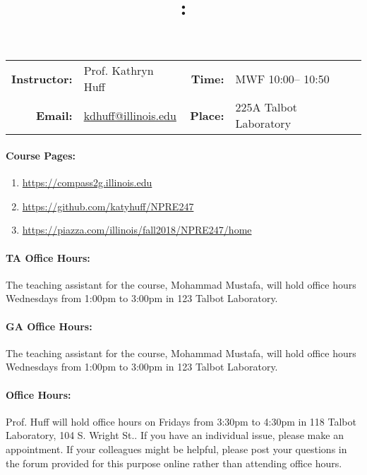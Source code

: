 \documentclass[11pt, a4paper]{article}
\title{\CourseNumber: \CourseTitle\\}
\author{\CourseUniversity}
\date{\CourseSemester \CourseYear}
\makeatletter
\newcommand{\CourseNumber}{NPRE247}
\newcommand{\CourseInstructor}{Prof. Kathryn Huff\xspace}%
\newcommand{\CourseDays}{MWF\xspace}%
\newcommand{\CourseStart}{10:00\xspace}%
\newcommand{\CourseEnd}{10:50\xspace}%
\newcommand{\CourseInstructorEmail}{kdhuff@illinois.edu}
\newcommand{\CourseRoom}{225A\xspace}%
\newcommand{\CourseBuilding}{Talbot Laboratory\xspace}%
\newcommand{\TeachingAssistant}{Mohammad Mustafa\xspace}%
\newcommand{\TAOfficeHourDays}{Wednesdays\xspace}%
\newcommand{\TAOfficeHourStart}{1:00pm\xspace}%
\newcommand{\TAOfficeHourEnd}{3:00pm\xspace}%
\newcommand{\TAOfficeHourPlace}{123 Talbot Laboratory\xspace}
\newcommand{\HuffOfficeHourDays}{Fridays\xspace}%
\newcommand{\HuffOfficeHourStart}{3:30pm\xspace}%
\newcommand{\HuffOfficeHourEnd}{4:30pm\xspace}%
\newcommand{\HuffOfficeHourPlace}{118 Talbot Laboratory, 104 S. Wright St.\xspace}
\makeatother
\begin{document}
\maketitle
\renewcommand{\arraystretch}{1.5}
\begin{center}
\begin{table}[h]
\begin{tabularx}{\textwidth}{rXrX}
\hline
\textbf{Instructor:} & \CourseInstructor & \textbf{Time:} & \CourseDays \CourseStart -- \CourseEnd \\
\textbf{Email:} &  \href{mailto:\CourseInstructorEmail}{\CourseInstructorEmail} & \textbf{Place:} & \CourseRoom \CourseBuilding\\
\hline
\end{tabularx}
\end{table}
\end{center}

\paragraph{Course Pages:}
\begin{enumerate}
        \item \url{https://compass2g.illinois.edu}
        \item \url{https://github.com/katyhuff/\CourseNumber}
        \item \url{https://piazza.com/illinois/fall2018/\CourseNumber/home}
\end{enumerate}

\paragraph{TA Office Hours:} The teaching assistant for the course, 
\TeachingAssistant, will hold office hours \TAOfficeHourDays from 
\TAOfficeHourStart to \TAOfficeHourEnd in \TAOfficeHourPlace.

\paragraph{GA Office Hours:} The teaching assistant for the course, 
\TeachingAssistant, will hold office hours \TAOfficeHourDays from 
\TAOfficeHourStart to \TAOfficeHourEnd in \TAOfficeHourPlace.

\paragraph{Office Hours:} Prof. Huff will hold office hours on 
\HuffOfficeHourDays from \HuffOfficeHourStart to \HuffOfficeHourEnd in \HuffOfficeHourPlace.
If you have an individual issue, please make an appointment. If your colleagues 
might be helpful, please post your questions in the forum provided for this 
purpose online rather than attending office hours.
\end{document}
